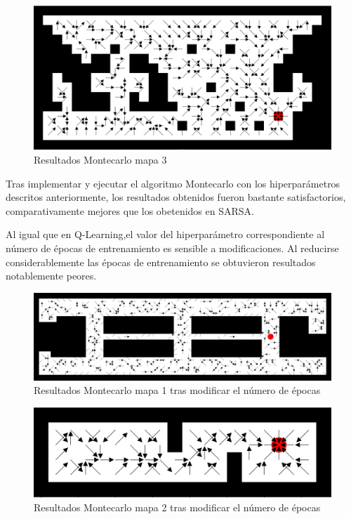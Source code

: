 \documentclass[conference,a4paper]{IEEEtran}
\begin{document}
\begin{figure}[h]
  \centering
  \includegraphics[scale=0.2]{report/Montecarlo3.png}
  \caption{Resultados Montecarlo mapa 3}
  \label{fig:Montecarlo3}
\end{figure}

Tras implementar y ejecutar el algoritmo Montecarlo con los hiperparámetros descritos anteriormente, los resultados obtenidos fueron bastante satisfactorios, comparativamente mejores que los obetenidos en SARSA. 

Al igual que en Q-Learning,el valor del hiperparámetro correspondiente al número de épocas de entrenamiento es sensible a modificaciones. Al reducirse considerablemente las épocas de entrenamiento se obtuvieron resultados notablemente peores.\newline

\begin{figure}[h]
  \centering
  \includegraphics[scale=0.18]{report/Montecarlo_epcoas.png}
  \caption{Resultados Montecarlo mapa 1 tras modificar el número de épocas}
  \label{fig:Montecarlo_epocas}
\end{figure}

\begin{figure}[h]
  \centering
  \includegraphics[scale=0.18]{report/Montecarlo2_epocas.png}
  \caption{Resultados Montecarlo mapa 2 tras modificar el número de épocas}
  \label{fig:Montecarlo2_epocas}
\end{figure}
\end{document}
